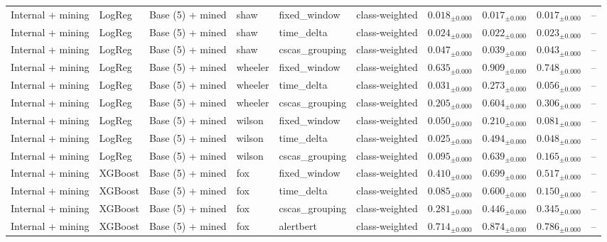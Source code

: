 \begin{longtable}{llllllcccc}
\addlinespace
Internal + mining & LogReg & Base (5) + mined & shaw & fixed\_window & class-weighted & $0.018_{\pm 0.000}$ & $0.017_{\pm 0.000}$ & $0.017_{\pm 0.000}$ & -- \\
\addlinespace
Internal + mining & LogReg & Base (5) + mined & shaw & time\_delta & class-weighted & $0.024_{\pm 0.000}$ & $0.022_{\pm 0.000}$ & $0.023_{\pm 0.000}$ & -- \\
\addlinespace
Internal + mining & LogReg & Base (5) + mined & shaw & cscas\_grouping & class-weighted & $0.047_{\pm 0.000}$ & $0.039_{\pm 0.000}$ & $0.043_{\pm 0.000}$ & -- \\
\addlinespace
Internal + mining & LogReg & Base (5) + mined & wheeler & fixed\_window & class-weighted & $0.635_{\pm 0.000}$ & $0.909_{\pm 0.000}$ & $0.748_{\pm 0.000}$ & -- \\
\addlinespace
Internal + mining & LogReg & Base (5) + mined & wheeler & time\_delta & class-weighted & $0.031_{\pm 0.000}$ & $0.273_{\pm 0.000}$ & $0.056_{\pm 0.000}$ & -- \\
\addlinespace
Internal + mining & LogReg & Base (5) + mined & wheeler & cscas\_grouping & class-weighted & $0.205_{\pm 0.000}$ & $0.604_{\pm 0.000}$ & $0.306_{\pm 0.000}$ & -- \\
\addlinespace
Internal + mining & LogReg & Base (5) + mined & wilson & fixed\_window & class-weighted & $0.050_{\pm 0.000}$ & $0.210_{\pm 0.000}$ & $0.081_{\pm 0.000}$ & -- \\
\addlinespace
Internal + mining & LogReg & Base (5) + mined & wilson & time\_delta & class-weighted & $0.025_{\pm 0.000}$ & $0.494_{\pm 0.000}$ & $0.048_{\pm 0.000}$ & -- \\
\addlinespace
Internal + mining & LogReg & Base (5) + mined & wilson & cscas\_grouping & class-weighted & $0.095_{\pm 0.000}$ & $0.639_{\pm 0.000}$ & $0.165_{\pm 0.000}$ & -- \\
\addlinespace
Internal + mining & XGBoost & Base (5) + mined & fox & fixed\_window & class-weighted & $0.410_{\pm 0.000}$ & $0.699_{\pm 0.000}$ & $0.517_{\pm 0.000}$ & -- \\
\addlinespace
Internal + mining & XGBoost & Base (5) + mined & fox & time\_delta & class-weighted & $0.085_{\pm 0.000}$ & $0.600_{\pm 0.000}$ & $0.150_{\pm 0.000}$ & -- \\
\addlinespace
Internal + mining & XGBoost & Base (5) + mined & fox & cscas\_grouping & class-weighted & $0.281_{\pm 0.000}$ & $0.446_{\pm 0.000}$ & $0.345_{\pm 0.000}$ & -- \\
\addlinespace
Internal + mining & XGBoost & Base (5) + mined & fox & alertbert & class-weighted & $0.714_{\pm 0.000}$ & $0.874_{\pm 0.000}$ & $0.786_{\pm 0.000}$ & -- \\

\end{longtable}
